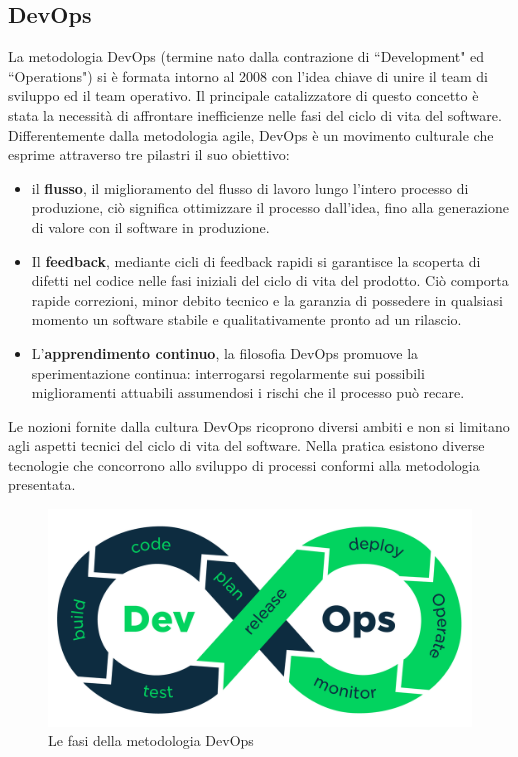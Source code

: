 \subsection{DevOps}
La metodologia DevOps (termine nato dalla contrazione di ``Development" ed ``Operations") si è formata intorno al 2008 con l'idea chiave di unire il team di sviluppo ed il team operativo. Il principale catalizzatore di questo concetto è stata la necessità di affrontare inefficienze nelle fasi del ciclo di vita del software. Differentemente dalla metodologia agile, DevOps è un movimento culturale che esprime attraverso tre pilastri il suo obiettivo:

\begin{itemize}
	\item il \textbf{flusso}, il miglioramento del flusso di lavoro lungo l'intero processo di produzione, ciò significa ottimizzare il processo dall'idea, fino alla generazione di valore con il software in produzione.
	\item Il \textbf{feedback}, mediante cicli di feedback rapidi si garantisce la scoperta di difetti nel codice nelle fasi iniziali del ciclo di vita del prodotto. Ciò comporta rapide correzioni, minor debito tecnico e la garanzia di possedere in qualsiasi momento un software stabile e qualitativamente pronto ad un rilascio.
	\item L'\textbf{apprendimento continuo}, la filosofia DevOps promuove la sperimentazione continua: interrogarsi regolarmente sui possibili miglioramenti attuabili assumendosi i rischi che il processo può recare.
\end{itemize}

Le nozioni fornite dalla cultura DevOps ricoprono diversi ambiti e non si limitano agli aspetti tecnici del ciclo di vita del software. Nella pratica esistono diverse tecnologie che concorrono allo sviluppo di processi conformi alla metodologia presentata.

\begin{figure}[htb]
	\centering
	\includegraphics[width=.9\linewidth]{figures/devops-process.png}
	\caption{Le fasi della metodologia DevOps}
	\label{fig:devops-process}
\end{figure}

